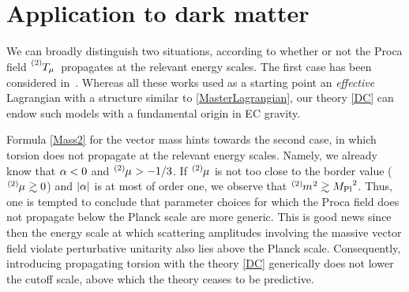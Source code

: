 \documentclass[aps,prd,reprint,preprintnumbers,showpacs,floatfix,nofootinbib,superscript address,longbibliography]{revtex4-1}
\begin{document}
\section{Application to dark matter}


We can broadly distinguish two situations, according to whether or not the Proca field $\T[2]{_{\mu}}$ propagates at the relevant energy scales. The first case has been considered in~\cite{Bekenstein:1971hc,Ford:1989me,Armendariz-Picon:2004say,Koivisto:2007bp,Koivisto:2008xf,Hambye:2008bq,Golovnev:2008cf,Chiba:2008eh,Koivisto:2008xf,Kanno:2008gn,Hambye:2009fg,Arina:2009uq,Hisano:2010yh,Diaz-Cruz:2010czr,Lebedev:2011iq,Farzan:2012hh,Baek:2012se,Tasinato:2014eka,DeFelice:2016yws,DeFelice:2016uil,BeltranJimenez:2016afo,Belyaev:2016icc,Emami:2016ldl,Heisenberg:2017hwb,Rodriguez:2017wkg,deFelice:2017paw,Nakamura:2018oyy,Arcadi:2020jqf,Heisenberg:2020xak,Benisty:2021sul,deRham:2021efp,Barman:2021qds,Garcia-Saenz:2021uyv}. Whereas all these works used as a starting point an \emph{effective} Lagrangian with a structure similar to \cref{MasterLagrangian}, our theory \eqref{DC} can endow such models with a fundamental origin in EC gravity.


Formula \eqref{Mass2} for the vector mass hints towards the second case, in which torsion does not propagate at the relevant energy scales. Namely, we already know that $\alp{5}<0$ and $\bet{2}>-1/3$. If $\bet{2}$ is not too close to the border value (\eg $\bet{2}\gtrsim0$) and $|\alp{5}|$ is at most of order one, we observe that $\mass[2]{}^2 \gtrsim \Planck^2$. Thus, one is tempted to conclude that parameter choices for which the Proca field does not propagate below the Planck scale are more generic. This is good news since then the energy scale at which scattering amplitudes involving the massive vector field violate perturbative unitarity also lies above the Planck scale. Consequently, introducing propagating torsion with the theory \eqref{DC} generically does not lower the cutoff scale, above which the theory ceases to be predictive. 
\end{document}
